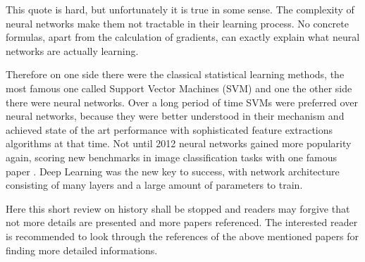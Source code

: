 This quote is hard, but unfortunately it is true in some sense. 
The complexity of neural networks make them not tractable in their learning process.
No concrete formulas, apart from the calculation of gradients, can exactly explain what neural networks are actually learning.

Therefore on one side there were the classical statistical learning methods, the most famous one called Support Vector Machines (SVM) \cite{Cortes1995} and one the other side there were neural networks.
Over a long period of time SVMs were preferred over neural networks, because they were better understood in their mechanism and achieved state of the art performance with sophisticated feature extractions algorithms at that time.
Not until 2012 neural networks gained more popularity again, scoring new benchmarks in image classification tasks with one famous paper \cite{Krizhevsky2012}.
Deep Learning was the new key to success, with network architecture consisting of many layers and a large amount of parameters to train.

Here this short review on history shall be stopped and readers may forgive that not more details are presented and more papers referenced.
The interested reader is recommended to look through the references of the above mentioned papers for finding more detailed informations.
